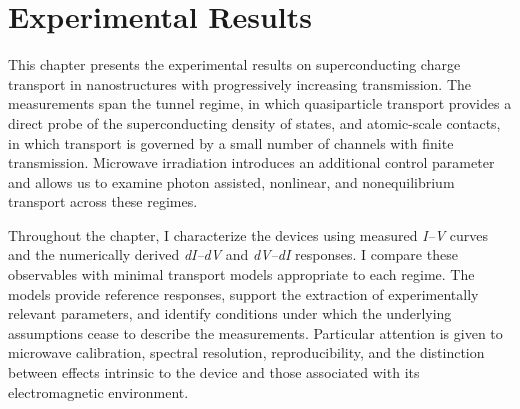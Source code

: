 
\chapter{Experimental Results}
\label{ch:results}
\thispagestyle{chapterstart}

    This chapter presents the experimental results on superconducting charge transport in nanostructures with progressively increasing transmission. The measurements span the tunnel regime, in which quasiparticle transport provides a direct probe of the superconducting density of states, and atomic-scale contacts, in which transport is governed by a small number of channels with finite transmission. Microwave irradiation introduces an additional control parameter and allows us to examine photon assisted, nonlinear, and nonequilibrium transport across these regimes.

    Throughout the chapter, I characterize the devices using measured \textit{I--V} curves and the numerically derived \textit{dI--dV} and \textit{dV--dI} responses. I compare these observables with minimal transport models appropriate to each regime. The models provide reference responses, support the extraction of experimentally relevant parameters, and identify conditions under which the underlying assumptions cease to describe the measurements. Particular attention is given to microwave calibration, spectral resolution, reproducibility, and the distinction between effects intrinsic to the device and those associated with its electromagnetic environment.
